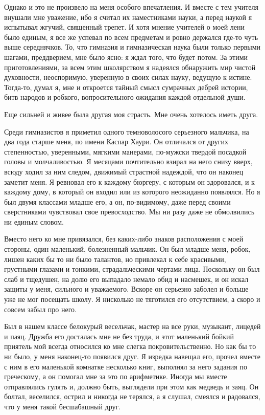 Однако и  это не  произвело на  меня особого  впечатления. И  вместе с
тем  учителя  внушали  мне  уважение, ибо  я  считал  их  наместниками
науки, а  перед наукой  я испытывал жгучий,  священный трепет.  И хотя
мнение  учителей  о  моей  лени  было единым,  я  все  же  успевал  по
всем  предметам и  ровно держался  где-то чуть  выше середнячков.  То,
что  гимназия  и  гимназическая  наука  были  только  первыми  шагами,
преддверием, мне  было ясно: я  ждал того,  что будет потом.  За этими
приготовлениями, за  всем этим  школярством я надеялся  обнаружить мир
чистой духовности, неоспоримую, уверенную в своих силах науку, ведущую
к истине.  Тогда-то, думал я,  мне и откроется тайный  смысл сумрачных
дебрей  истории,  битв  народов и  робкого,  вопросительного  ожидания
каждой отдельной души.

Еще сильней и живее была другая  моя страсть. Мне очень хотелось иметь
друга.

Среди гимназистов я приметил одного темноволосого серьезного мальчика,
на два года старше меня, по имени Каспар Хаури. Он отличался от других
степенностью, уверенными, мягкими манерами, по-мужски твердой посадкой
головы и  молчаливостью. Я месяцами  почтительно взирал на  него снизу
вверх, всюду ходил за ним  следом, движимый страстной надеждой, что он
наконец  заметит меня.  Я ревновал  его к  каждому бюргеру,  с которым
он  здоровался,  и  к  каждому  дому,  в  который  он  входил  или  из
которого неожиданно появлялся.  Но я был двумя классами  младше его, а
он,  по-видимому,  даже  перед  своими  сверстниками  чувствовал  свое
превосходство. Мы ни разу даже не обмолвились ни единым словом.

Вместо него  ко мне привязался,  без каких-либо знаков  расположения с
моей стороны, один маленький, болезненный мальчик. Он был младше меня,
робок,  лишен каких  бы  то  ни было  талантов,  но  привлекал к  себе
красивыми, грустными глазами и  тонкими, страдальческими чертами лица.
Поскольку он был  слаб и тщедушен, на долю его  выпадало немало обид и
насмешек, и он  искал защиты у меня, сильного и  уважаемого. Вскоре он
серьезно заболел  и больше уже не  мог посещать школу. Я  нисколько не
тяготился его отсутствием, а скоро и совсем забыл про него.

Был в нашем классе белокурый  весельчак, мастер на все руки, музыкант,
лицедей  и  паяц. Дружба  его  досталась  мне  не  без труда,  и  этот
маленький  бойкий   приятель  мой  всегда  относился   ко  мне  слегка
покровительственно. Но как  бы то ни было, у  меня наконец-то появился
друг.  Я изредка  навещал его,  прочел вместе  с ним  в его  маленькой
комнатке несколько книг, выполнял за  него задания по греческому, а он
помогал мне за это по арифметике. Иногда мы вместе отправлялись гулять
и, должно  быть, выглядели  при этом  как медведь  и заяц.  Он болтал,
веселился,  острил  и  никогда  не  терялся, а  я  слушал,  смеялся  и
радовался, что у меня такой бесшабашный друг.

